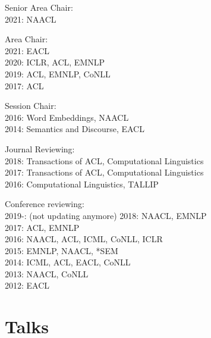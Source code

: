 \documentclass[margin,line]{res}
\begin{document}
\begin{resume}
\begin{hangparas}{.25in}{1}
Senior Area Chair:\\
2021: NAACL

Area Chair:\\
2021: EACL\\
2020: ICLR, ACL, EMNLP\\
2019: ACL, EMNLP, CoNLL\\
2017: ACL

Session Chair:\\
2016: Word Embeddings, NAACL\\
2014: Semantics and Discourse, EACL

Journal Reviewing: \\
2018: Transactions of ACL, Computational Linguistics\\
2017: Transactions of ACL, Computational Linguistics\\
2016: Computational Linguistics, TALLIP

Conference reviewing: \\
2019-: (not updating anymore)
2018: NAACL, EMNLP\\
2017: ACL, EMNLP\\
2016: NAACL, ACL, ICML, CoNLL, ICLR\\
2015: EMNLP, NAACL, *SEM\\
2014: ICML, ACL, EACL, CoNLL \\
2013: NAACL, CoNLL \\
2012: EACL

\end{hangparas}

\section{\sc Talks}
\begin{hangparas}{.25in}{1}


\end{hangparas}
\end{resume}
\end{document}
